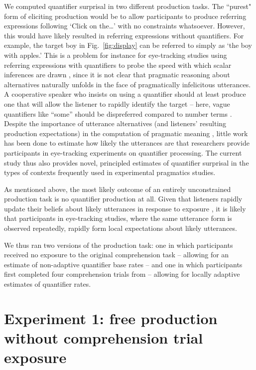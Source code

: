 \documentclass[10pt,letterpaper]{article}
\newcommand{\figref}[1]{Fig.~\ref{#1}}
\begin{document}
We computed quantifier surprisal in two different production tasks. The ``purest" form of eliciting production would be to allow participants to produce referring expressions following `Click on the\dots' with no constraints whatsoever. However, this would have likely resulted in referring expressions without quantifiers. For example, the target boy in \figref{fig:display} can be referred to simply as `the boy with apples.' This is a problem for instance for eye-tracking studies using referring expressions with quantifiers to probe the speed with which scalar inferences are drawn \cite{huang2009,grodner2010,DegenT2016,sun2020}, since it is not clear that pragmatic reasoning about alternatives naturally unfolds in the face of pragmatically infelicitous utterances. A cooperative speaker who insists on using a quantifier should at least produce one that will allow the listener to rapidly identify the target -- here, vague quantifiers like ``some'' should be dispreferred compared to number terms \cite<especially with the small set sizes considered here, >{DegenTanenhaus2015,sun2020}. Despite the importance of utterance alternatives (and listeners' resulting  production expectations) in the computation of pragmatic meaning \cite{franke2014,Goodman2016,peloquin2016,DegenTanenhaus2015,DegenT2016,gotzner2016,sun2020}, little work has been done to estimate how likely the utterances are that researchers provide participants in eye-tracking experiments on quantifier processing. The current study thus also provides novel, principled estimates of quantifier surprisal in the types of contexts frequently used in experimental pragmatics studies.

As mentioned above, the most likely outcome of an entirely unconstrained production task is  no quantifier production at all. Given that listeners rapidly update their beliefs about likely utterances in response to exposure \cite{grodner2011,pogue2016,schuster2020}, it is likely that participants in eye-tracking studies, where the same utterance form is observed repeatedly, rapidly form local expectations about likely utterances. 

We thus ran two versions of the production task: one in which participants received no exposure to the original comprehension task -- allowing for an estimate of non-adaptive quantifier base rates -- and one in which participants first completed four comprehension trials from  -- allowing for locally adaptive estimates of quantifier rates.

\section{Experiment 1: free production without   comprehension trial exposure}
\end{document}
